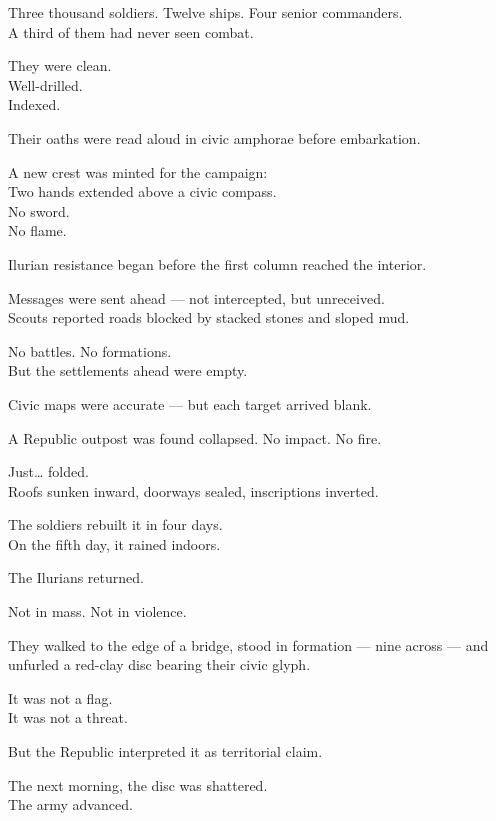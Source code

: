 \documentclass[9pt]{article}
\begin{document}
Three thousand soldiers. Twelve ships. Four senior commanders.\\
A third of them had never seen combat.

They were clean.\\
Well-drilled.\\
Indexed.

Their oaths were read aloud in civic amphorae before embarkation.

A new crest was minted for the campaign:\\
Two hands extended above a civic compass.\\
No sword.\\
No flame.

\vspace{1em}

Ilurian resistance began before the first column reached the interior.

Messages were sent ahead --- not intercepted, but unreceived.\\
Scouts reported roads blocked by stacked stones and sloped mud.

No battles. No formations.\\
But the settlements ahead were empty.

Civic maps were accurate --- but each target arrived blank.

\vspace{1em}

A Republic outpost was found collapsed. No impact. No fire.

Just… folded.\\
Roofs sunken inward, doorways sealed, inscriptions inverted.

The soldiers rebuilt it in four days.\\
On the fifth day, it rained indoors.

\vspace{1em}

The Ilurians returned.

Not in mass. Not in violence.

They walked to the edge of a bridge, stood in formation --- nine across --- and unfurled a red-clay disc bearing their civic glyph.

It was not a flag.\\
It was not a threat.

But the Republic interpreted it as territorial claim.

The next morning, the disc was shattered.\\
The army advanced.
\end{document}
